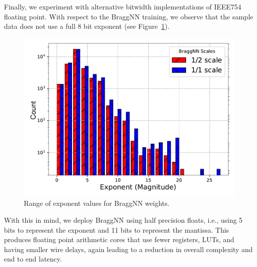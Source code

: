 Finally, we experiment with alternative bitwidth implementations of IEEE754 floating point.
With respect to the BraggNN training, we observe that the sample data does not use a full 8 bit exponent (see Figure~\ref{fig:numexp}).
\begin{figure}
	\includegraphics[width=\columnwidth]{figures/exp_hist}
	\caption{Range of exponent values for BraggNN weights.}\label{fig:numexp}
\end{figure}
With this in mind, we deploy BraggNN using half precision floats, i.e., using 5 bits to represent the exponent and 11 bits to represent the mantissa.
This produces floating point arithmetic cores that use fewer registers, LUTs, and having smaller wire delays, again leading to a reduction in overall complexity and end to end latency.
